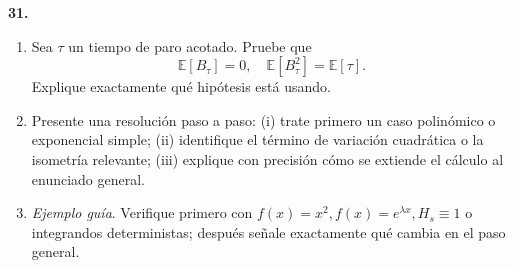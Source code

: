 \documentclass[11pt, letterpaper]{article}
\begin{document}
\newpage

\begin{ejercicio}
    \textbf{31.} 
    \begin{enumerate}
        \item Sea $\tau$ un tiempo de paro acotado. Pruebe que
        \[ \mathbb{E}[B_\tau] = 0, \quad \mathbb{E}[B_\tau^2] = \mathbb{E}[\tau]. \]
        Explique exactamente qué hipótesis está usando.
        \item Presente una resolución paso a paso: (i) trate primero un caso polinómico o exponencial simple; (ii) identifique el término de variación cuadrática o la isometría relevante; (iii) explique con precisión cómo se extiende el cálculo al enunciado general.
        \item \textit{Ejemplo guía}. Verifique primero con $f(x) = x^2, f(x) = e^{\lambda x}, H_s \equiv 1$ o integrandos deterministas; después señale exactamente qué cambia en el paso general.
    \end{enumerate}
\end{ejercicio}

\vspace{5mm}
\end{document}

